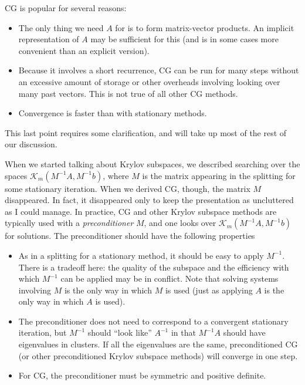 \documentclass[12pt, leqno]{article}
\newcommand{\calK}{\mathcal{K}}
\begin{document}
CG is popular for several reasons:
\begin{itemize}
\item
  The only thing we need $A$ for is to form matrix-vector products.
  An implicit representation of $A$ may be sufficient for this
  (and is in some cases more convenient than an explicit version).
\item
  Because it involves a short recurrence, CG can be run for many steps
  without an excessive amount of storage or other overheads involving
  looking over many past vectors.  This is not true of all other CG
  methods.
\item
  Convergence is faster than with stationary methods.
\end{itemize}
This last point requires some clarification, and will take up most of
the rest of our discussion.

When we started talking about Krylov subspaces, we described searching
over the spaces $\calK_m(M^{-1} A, M^{-1} b)$, where $M$ is the matrix
appearing in the splitting for some stationary iteration.  When we
derived CG, though, the matrix $M$ disappeared.  In fact, it
disappeared only to keep the presentation as uncluttered as I could
manage.  In practice, CG and other Krylov subspace methods are
typically used with a {\em preconditioner} $M$, and one looks over
$\calK_m(M^{-1} A, M^{-1} b)$ for solutions.  The preconditioner
should have the following properties
\begin{itemize}
\item
  As in a splitting for a stationary method, it should be easy to
  apply $M^{-1}$.  There is a tradeoff here: the quality of the
  subspace and the efficiency with which $M^{-1}$ can be applied may
  be in conflict.  Note that solving systems involving $M$ is the only
  way in which $M$ is used (just as applying $A$ is the only way in
  which $A$ is used).
\item
  The preconditioner does not need to correspond to a convergent
  stationary iteration, but $M^{-1}$ should ``look like'' $A^{-1}$
  in that $M^{-1} A$ should have eigenvalues in clusters.  If all the
  eigenvalues are the same, preconditioned CG (or other preconditioned
  Krylov subspace methods) will converge in one step.
\item
  For CG, the preconditioner must be symmetric and positive definite.
\end{itemize}
\end{document}
